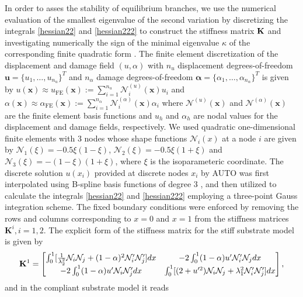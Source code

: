 In order to asses the stability of equilibrium branches, we use  the numerical evaluation of the smallest eigenvalue of the second variation by discretizing the integrals \eqref{hessian22} and   \eqref{hessian222} to construct the stiffness matrix
${\bf K}$ and investigating numerically the sign of the minimal eigenvalue $\kappa$ of the corresponding finite quadratic form \cite{Sanderson2016-ht}.  The finite element discretization of the displacement and damage field $(u, \alpha )$     with \( n_u \) displacement degrees-of-freedom 
$
\mathbf{u} = \{ u_1, \ldots, u_{n_u} \}^T 
$
and \( n_\alpha \) damage degrees-of-freedom 
$
\boldsymbol{\alpha} = \{ \alpha_1, \ldots, \alpha_{n_\alpha} \}^T
$ is given by 
$
u(\mathbf{x}) \approx u_{\text{FE}} (\mathbf{x}) := \sum_{i=1}^{n_u} \mathcal{N}^{(u)}_i(\mathbf{x}) u_i $
and $\alpha(\mathbf{x}) \approx \alpha_{\text{FE}} (\mathbf{x}) := \sum_{i=1}^{n_\alpha} \mathcal{N}^{(\alpha)}_i (\mathbf{x}) \alpha_i 
$
where $\mathcal{N}^{(u)}(\mathbf{x}) $ and $\mathcal{N}^{(\alpha)}(\mathbf{x}) $ are the finite element basis functions and  $u_h$ and  $\alpha_h$ are nodal values for the displacement and damage fields, respectively. We used quadratic one-dimensional finite elements with 3 nodes  whose   shape functions   ${\mathcal N}_i(x)$ at a node $i$  are given by ${\mathcal N}_1(\xi)=-0.5\xi(1-\xi)$, ${\mathcal N}_2(\xi)=-0.5\xi(1+\xi)$ and ${\mathcal N}_3(\xi)=-(1-\xi)(1+\xi)$, where $\xi$ is the isoparameteric coordinate. The discrete solution $u(x_i)$ provided at discrete nodes $x_i$ by AUTO was first interpolated using B-spline basis functions of degree 3 \cite{Grimstad2016-cq}, and then utilized to calculate the integrals \eqref{hessian22} and   \ref{hessian222} employing a three-point Gauss integration scheme. The fixed boundary conditions were enforced by removing the rows and columns corresponding to $x = 0$ and $x = 1$ from the stiffness matrices $\mathbf{K}^i, i = 1, 2$. The explicit form of the stiffness matrix for the stiff substrate model is given by
\begin{equation}
{\bf K}^1=\begin{bmatrix}
\int_0^1[ \frac{1}{\lambda_2^2}{\mathcal N}_i{\mathcal N}_j + (1-\alpha)^2{\mathcal N}'_i{\mathcal N}'_j
] dx&
-2\int_0^1(1-\alpha)u' {\mathcal N}'_i {\mathcal N}_j  dx\\
-2\int_0^1(1-\alpha)u' {\mathcal N}_i {\mathcal N}'_j dx
& \int_0^1 [ (2+u'^2){\mathcal N}_i{\mathcal N}_j +\lambda_1^2{\mathcal N}'_i{\mathcal N}'_j] dx
\end{bmatrix},
\label{eq:stifness1}
\end{equation}
and in the compliant substrate model it reads


